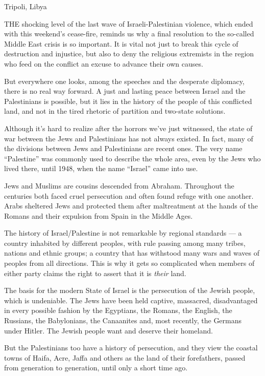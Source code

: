 Tripoli, Libya

THE shocking level of the last wave of Israeli-Palestinian violence,
which ended with this weekend's cease-fire, reminds us why a final
resolution to the so-called Middle East crisis is so important. It is
vital not just to break this cycle of destruction and injustice, but
also to deny the religious extremists in the region who feed on the
conflict an excuse to advance their own causes.

But everywhere one looks, among the speeches and the desperate
diplomacy, there is no real way forward. A just and lasting peace
between Israel and the Palestinians is possible, but it lies in the
history of the people of this conflicted land, and not in the tired
rhetoric of partition and two-state solutions.

Although it's hard to realize after the horrors we've just witnessed,
the state of war between the Jews and Palestinians has not always
existed. In fact, many of the divisions between Jews and Palestinians
are recent ones. The very name ``Palestine'' was commonly used to
describe the whole area, even by the Jews who lived there, until 1948,
when the name ``Israel'' came into use.

Jews and Muslims are cousins descended from Abraham. Throughout the
centuries both faced cruel persecution and often found refuge with one
another. Arabs sheltered Jews and protected them after maltreatment at
the hands of the Romans and their expulsion from Spain in the Middle
Ages.

The history of Israel/Palestine is not remarkable by regional standards
--- a country inhabited by different peoples, with rule passing among
many tribes, nations and ethnic groups; a country that has withstood
many wars and waves of peoples from all directions. This is why it gets
so complicated when members of either party claims the right to assert
that it is \emph{their} land.

The basis for the modern State of Israel is the persecution of the
Jewish people, which is undeniable. The Jews have been held captive,
massacred, disadvantaged in every possible fashion by the Egyptians, the
Romans, the English, the Russians, the Babylonians, the Canaanites and,
most recently, the Germans under Hitler. The Jewish people want and
deserve their homeland.

But the Palestinians too have a history of persecution, and they view
the coastal towns of Haifa, Acre, Jaffa and others as the land of their
forefathers, passed from generation to generation, until only a short
time ago.

